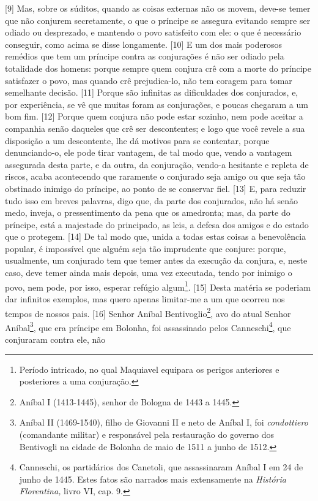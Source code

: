 {[}9{]} Mas, sobre os súditos, quando as coisas externas não os movem,
deve-se temer que não conjurem secretamente, o que o príncipe se
assegura evitando sempre ser odiado ou desprezado, e mantendo o povo
satisfeito com ele: o que é necessário conseguir, como acima se disse
longamente. {[}10{]} E um dos mais poderosos remédios que tem um
príncipe contra as conjurações é não ser odiado pela totalidade dos
homens: porque sempre quem conjura crê com a morte do príncipe
satisfazer o povo, mas quando crê prejudica-lo, não tem coragem para
tomar semelhante decisão. {[}11{]} Porque são infinitas as dificuldades
dos conjurados, e, por experiência, se vê que muitas foram as
conjurações, e poucas chegaram a um bom fim. {[}12{]} Porque quem
conjura não pode estar sozinho, nem pode aceitar a companhia senão
daqueles que crê ser descontentes; e logo que você revele a sua
disposição a um descontente, lhe dá motivos para se contentar, porque
denunciando-o, ele pode tirar vantagem, de tal modo que, vendo a
vantagem assegurada desta parte, e da outra, da conjuração, vendo-a
hesitante e repleta de riscos, acaba acontecendo que raramente o
conjurado seja amigo ou que seja tão obstinado inimigo do príncipe, ao
ponto de se conservar fiel. {[}13{]} E, para reduzir tudo isso em breves
palavras, digo que, da parte dos conjurados, não há senão medo, inveja,
o pressentimento da pena que os amedronta; mas, da parte do príncipe,
está a majestade do principado, as leis, a defesa dos amigos e do estado
que o protegem. {[}14{]} De tal modo que, unida a todas estas coisas a
benevolência popular, é impossível que alguém seja tão imprudente que
conjure: porque, usualmente, um conjurado tem que temer antes da
execução da conjura, e, neste caso, deve temer ainda mais depois, uma
vez executada, tendo por inimigo o povo, nem pode, por isso, esperar
refúgio algum\footnote{Período intricado, no qual Maquiavel equipara os
  perigos anteriores e posteriores a uma conjuração.}. {[}15{]} Desta
matéria se poderiam dar infinitos exemplos, mas quero apenas limitar-me
a um que ocorreu nos tempos de nossos pais. {[}16{]} Senhor Aníbal
Bentivoglio\footnote{Aníbal I (1413-1445), senhor de Bologna de 1443 a
  1445.}, avo do atual Senhor Aníbal\footnote{Aníbal II (1469-1540),
  filho de Giovanni II e neto de Aníbal I, foi \emph{condottiero}
  (comandante militar) e responsável pela restauração do governo dos
  Bentivogli na cidade de Bolonha de maio de 1511 a junho de 1512.}, que
era príncipe em Bolonha, foi assassinado pelos Canneschi\footnote{Canneschi,
  os partidários dos Canetoli, que assassinaram Aníbal I em 24 de junho
  de 1445. Estes fatos são narrados mais extensamente na \emph{História
  Florentina,} livro VI, cap. 9.}, que conjuraram contra ele, não
